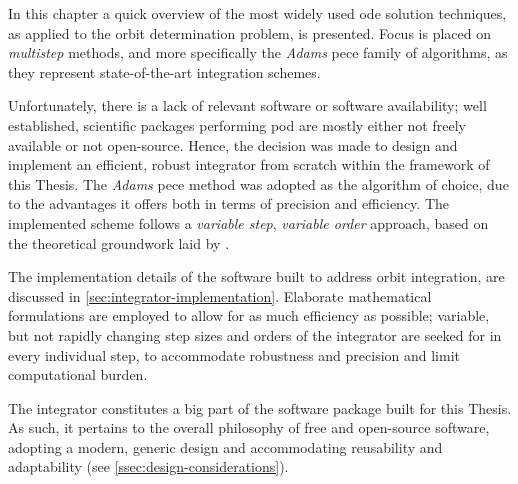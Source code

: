In this chapter a quick overview of the most widely used \gls{ode} 
solution techniques, as applied to the orbit determination problem, is presented. 
Focus is placed on \emph{multistep} methods, and more specifically the \emph{Adams} 
\gls{pece} family of algorithms, as they represent state-of-the-art integration 
schemes.

Unfortunately, there is a lack of relevant software or software availability; well 
established, scientific packages performing \gls{pod} are mostly either not freely 
available or not open-source. Hence, the decision was made to design and implement 
an efficient, robust integrator from scratch within the framework of this Thesis. 
The \emph{Adams} \gls{pece} method was adopted as the algorithm of choice, due to  
the advantages it offers both in terms of precision and efficiency. The implemented 
scheme follows a \emph{variable step}, \emph{variable order} approach, based on 
the theoretical groundwork laid by \cite{Shampine1975}.

The implementation details of the software built to address orbit integration, are discussed 
in \autoref{sec:integrator-implementation}. Elaborate mathematical formulations are 
employed to allow for as much efficiency as possible; variable, but not rapidly 
changing step sizes and orders of the integrator are seeked for in every individual 
step, to accommodate robustness and precision and limit computational burden.

The integrator constitutes a big part of the software package built for this Thesis. 
As such, it pertains to the overall philosophy of free and open-source software, 
adopting a modern, generic design and accommodating reusability and adaptability 
(see \autoref{ssec:design-considerations}).
